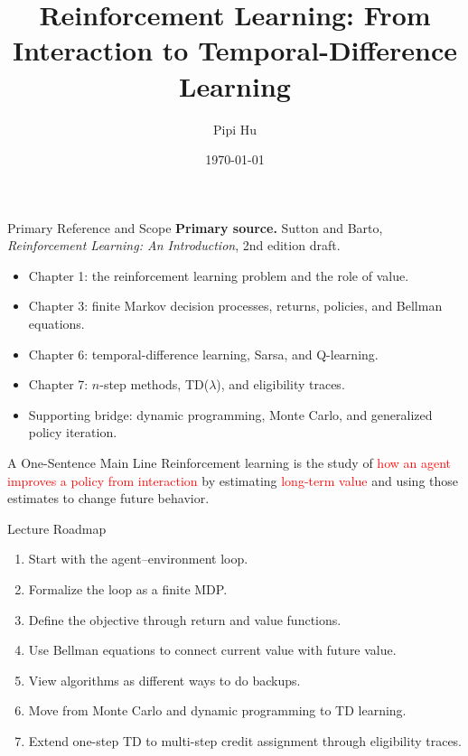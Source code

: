 \documentclass[aspectratio=169]{beamer}
\title[Reinforcement Learning]{Reinforcement Learning: From Interaction to Temporal-Difference Learning}
\author{Pipi Hu}
\institute[BIMSA]{Beijing Institute of Mathematical Sciences and Applications}
\date{\today}
\newcommand{\red}[1]{\textcolor{red}{#1}}
\begin{document}
\begin{frame}
  \titlepage
\end{frame}

\begin{frame}{Primary Reference and Scope}
\small
\textbf{Primary source.} Sutton and Barto, \emph{Reinforcement Learning: An Introduction}, 2nd edition draft.

\vspace{0.6em}
\begin{itemize}
    \item Chapter 1: the reinforcement learning problem and the role of value.
    \item Chapter 3: finite Markov decision processes, returns, policies, and Bellman equations.
    \item Chapter 6: temporal-difference learning, Sarsa, and Q-learning.
    \item Chapter 7: $n$-step methods, TD($\lambda$), and eligibility traces.
    \item Supporting bridge: dynamic programming, Monte Carlo, and generalized policy iteration.
\end{itemize}
\end{frame}

\begin{frame}{A One-Sentence Main Line}
\centering
\Large
Reinforcement learning is the study of \red{how an agent improves a policy from interaction} by estimating \red{long-term value} and using those estimates to change future behavior.
\end{frame}

\begin{frame}{Lecture Roadmap}
\small
\begin{enumerate}
    \item Start with the agent--environment loop.
    \item Formalize the loop as a finite MDP.
    \item Define the objective through return and value functions.
    \item Use Bellman equations to connect current value with future value.
    \item View algorithms as different ways to do backups.
    \item Move from Monte Carlo and dynamic programming to TD learning.
    \item Extend one-step TD to multi-step credit assignment through eligibility traces.
\end{enumerate}
\end{frame}
\end{document}

